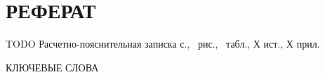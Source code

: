 \section*{РЕФЕРАТ}

TODO
Расчетно-пояснительная записка \pageref{LastPage} с., \totalfigures\ рис., \totaltables\ табл., Х ист., Х прил.

КЛЮЧЕВЫЕ СЛОВА

\pagebreak